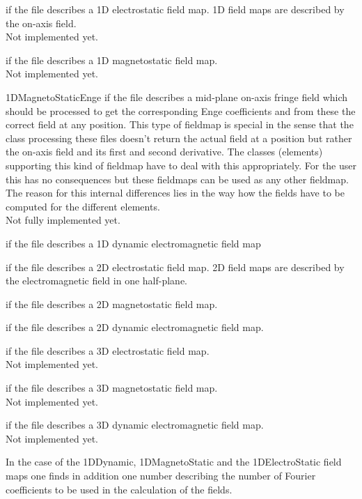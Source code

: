 \begin{description}
\item[1DElectroStatic]
if the file describes a 1D electrostatic field map. 1D field maps are described by the on-axis field.\\
Not implemented yet.
\item[1DMagnetoStatic]
if the file describes a 1D magnetostatic field map.\\
Not implemented yet.
\item{1DMagnetoStaticEnge}
if the file describes a mid-plane on-axis fringe field which should be processed to get the corresponding Enge coefficients and from these the correct field at any position. This type of fieldmap is special in the sense that the class processing these files doesn't return the actual field at a position but rather the on-axis field and its first and second derivative. The classes (elements) supporting this kind of fieldmap have to deal with this appropriately. For the user this has no consequences but these fieldmaps can be used as any other fieldmap. The reason for this internal differences lies in the way how the fields have to be computed for the different elements.\\
Not fully implemented yet.
\item[1DDynamic]
if the file describes a 1D dynamic electromagnetic field map
\item[2DElectroStatic]
if the file describes a 2D electrostatic field map. 2D field maps are described by the electromagnetic field in one half-plane.
\item[2DMagnetoStatic]
if the file describes a 2D magnetostatic field map.
\item[2DDynamic]
if the file describes a 2D dynamic electromagnetic field map.
\item[3DElectroStatic]
if the file describes a 3D electrostatic field map.\\
Not implemented yet.
\item[3DMagnetoStatic]
if the file describes a 3D magnetostatic field map.\\
Not implemented yet.
\item[3DDynamic]
if the file describes a 3D dynamic electromagnetic field map.\\
Not implemented yet.
\end{description}
In the case of the 1DDynamic, 1DMagnetoStatic and the 1DElectroStatic field maps one finds in addition one number describing the number of Fourier coefficients to be used in the calculation of the fields. 

